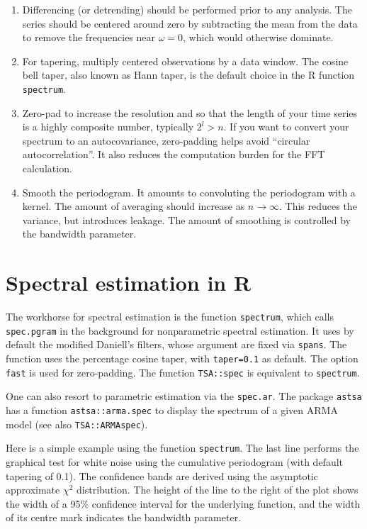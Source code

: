 \documentclass[]{book}
\providecommand{\tightlist}{%
  \setlength{\itemsep}{0pt}\setlength{\parskip}{0pt}}
\begin{document}
\begin{enumerate}
\def\labelenumi{\arabic{enumi}.}
\tightlist
\item
  Differencing (or detrending) should be performed prior to any
  analysis. The series should be centered around zero by subtracting the
  mean from the data to remove the frequencies near \(\omega=0\), which
  would otherwise dominate.
\item
  For tapering, multiply centered observations by a data window. The
  cosine bell taper, also known as Hann taper, is the default choice in
  the R function \texttt{spectrum}.
\item
  Zero-pad to increase the resolution and so that the length of your
  time series is a highly composite number, typically \(2^l>n\). If you
  want to convert your spectrum to an autocovariance, zero-padding helps
  avoid ``circular autocorrelation''. It also reduces the computation
  burden for the FFT calculation.
\item
  Smooth the periodogram. It amounts to convoluting the periodogram with
  a kernel. The amount of averaging should increase as \(n \to \infty\).
  This reduces the variance, but introduces leakage. The amount of
  smoothing is controlled by the bandwidth parameter.
\end{enumerate}

\section{Spectral estimation in R}\label{spectral-estimation-in-r}

The workhorse for spectral estimation is the function \texttt{spectrum},
which calls \texttt{spec.pgram} in the background for nonparametric
spectral estimation. It uses by default the modified Daniell's filters,
whose argument are fixed via \texttt{spans}. The function uses the
percentage cosine taper, with \texttt{taper=0.1} as default. The option
\texttt{fast} is used for zero-padding. The function \texttt{TSA::spec}
is equivalent to \texttt{spectrum}.

One can also resort to parametric estimation via the \texttt{spec.ar}.
The package \texttt{astsa} has a function \texttt{astsa::arma.spec} to
display the spectrum of a given ARMA model (see also
\texttt{TSA::ARMAspec}).

Here is a simple example using the function \texttt{spectrum}. The last
line performs the graphical test for white noise using the cumulative
periodogram (with default tapering of 0.1). The confidence bands are
derived using the asymptotic approximate \(\chi^2\) distribution. The
height of the line to the right of the plot shows the width of a 95\%
confidence interval for the underlying function, and the width of its
centre mark indicates the bandwidth parameter.
\end{document}
